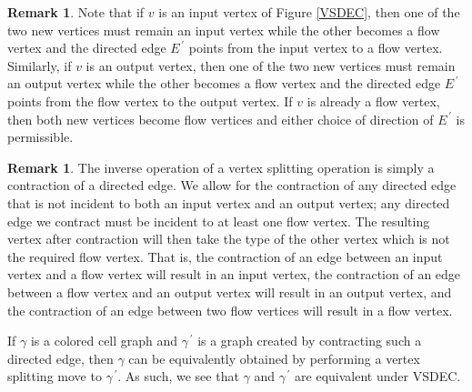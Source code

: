 \documentclass{amsart}
\newcommand{\pri}{^{\,\prime}}
\theoremstyle{definition}
\newtheorem{Rmk}[Lem]{Remark}
\begin{document}
\begin{Rmk} 
	Note that if $v$ is an input vertex of Figure \ref{VSDEC}, then one of the two new vertices must remain an input vertex while the other becomes a flow vertex and the directed edge $E\pri$ points from the input vertex to a flow vertex. Similarly, if $v$ is an output vertex, then one of the two new vertices must remain an output vertex while the other becomes a flow vertex and the directed edge $E\pri$ points from the flow vertex to the output vertex. If $v$ is already a flow vertex, then both new vertices become flow vertices and either choice of direction of $E\pri$ is permissible.
\end{Rmk}
\begin{Rmk}
	
	The inverse operation of a vertex splitting operation is simply a contraction of a directed edge. We allow for the contraction of any directed edge that is not incident to both an input vertex and an output vertex; any directed edge we contract must be incident to at least one flow vertex. The resulting vertex after contraction will then take the type of the other vertex which is not the required flow vertex. That is, the contraction of an edge between an input vertex and a flow vertex will result in an input vertex, the contraction of an edge between a flow vertex and an output vertex will result in an output vertex, and the contraction of an edge between two flow vertices will result in a flow vertex.
	
	
	If $\gamma$ is a colored cell graph and $\gamma\pri$ is a graph created by contracting such a directed edge, then $\gamma$ can be equivalently obtained by performing a vertex splitting move to $\gamma\pri$. As such, we see that $\gamma$ and $\gamma\pri$ are equivalent under VSDEC.
\end{Rmk}
\end{document}

